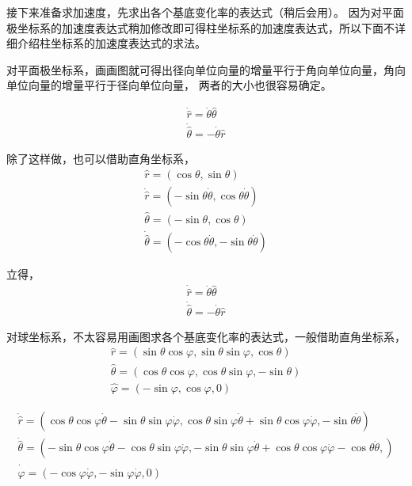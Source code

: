 \documentclass{ctexart}
\begin{document}
    接下来准备求加速度，先求出各个基底变化率的表达式（稍后会用）。
    因为对平面极坐标系的加速度表达式稍加修改即可得柱坐标系的加速度表达式，所以下面不详细介绍柱坐标系的加速度表达式的求法。

    对平面极坐标系，画画图就可得出径向单位向量的增量平行于角向单位向量，角向单位向量的增量平行于径向单位向量，
    两者的大小也很容易确定。

    \begin{gather*}
        \dot{\hat{r}} = \dot{\theta}\hat{\theta} \\
        \dot{\hat{\theta}} = -\dot{\theta}\hat{r}
    \end{gather*}

    除了这样做，也可以借助直角坐标系，
    \begin{gather*}
        \hat{r} = (\cos\theta,\sin\theta) \\
        \dot{\hat{r}} = (-\sin\theta\dot{\theta},\cos\theta\dot{\theta}) \\
        \hat{\theta} = (-\sin\theta,\cos\theta) \\
        \dot{\hat{\theta}} = (-\cos\theta\dot{\theta},-\sin\theta\dot{\theta})
    \end{gather*}

    立得，
    \begin{gather*}
        \dot{\hat{r}} = \dot{\theta}\hat{\theta} \\
        \dot{\hat{\theta}} = -\dot{\theta}\hat{r}
    \end{gather*}

    对球坐标系，不太容易用画图求各个基底变化率的表达式，一般借助直角坐标系，
    \begin{gather*}
        \hat{r} = (\sin\theta\cos\varphi,\sin\theta\sin\varphi,\cos\theta) \\
        \hat{\theta} = (\cos\theta\cos\varphi,\cos\theta\sin\varphi,-\sin\theta) \\
        \hat{\varphi} = (-\sin\varphi,\cos\varphi,0)
    \end{gather*}

    \begin{gather*}
        \dot{\hat{r}} = (\cos\theta\cos\varphi\dot{\theta}-\sin\theta\sin\varphi\dot{\varphi},
        \cos\theta\sin\varphi\dot{\theta}+\sin\theta\cos\varphi\dot{\varphi},
        -\sin\theta\dot{\theta}) \\
        \dot{\hat{\theta}} = (-\sin\theta\cos\varphi\dot{\theta}-\cos\theta\sin\varphi\dot{\varphi},
        -\sin\theta\sin\varphi\dot{\theta}+\cos\theta\cos\varphi\dot{\varphi}
        -\cos\theta\dot{\theta},) \\
        \dot{\hat{\varphi}} = (-\cos\varphi\dot{\varphi},-\sin\varphi\dot{\varphi},0)
    \end{gather*}
\end{document}
